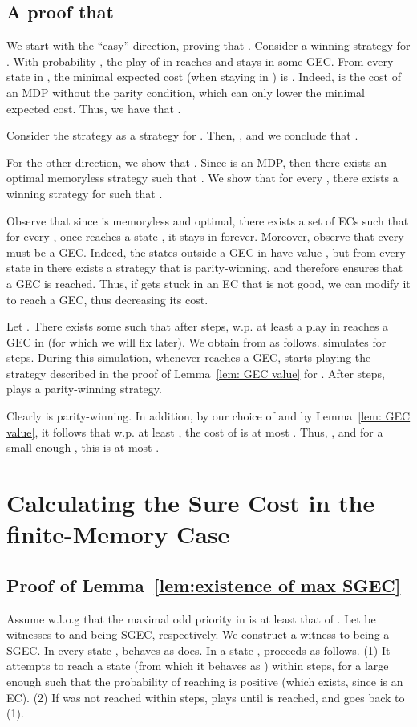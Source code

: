 \documentclass[runningheads,a4paper]{llncs}
\newcommand{\gec}{{GEC}\xspace}
\newcommand{\sgec}{{SGEC}\xspace}
\begin{document}
\subsection{A proof that }

We start with the ``easy'' direction, proving that . Consider a winning strategy  for . With probability , the play of  in  reaches and stays in some \gec . From every state in , the minimal expected cost (when staying in ) is . Indeed,  is the cost of an MDP without the parity condition, which can only lower the minimal expected cost.
 Thus, we have that .

Consider the strategy  as a strategy for . Then, , and we conclude that .

For the other direction, we show that . Since  is an MDP, then there exists an optimal memoryless strategy  such that . We show that for every , there exists a winning strategy  for  such that . 

Observe that since  is memoryless and optimal, there exists a set of ECs   such that for every , once  reaches a state , it stays in  forever. Moreover, observe that every  must be a \gec. Indeed, the states outside a \gec in  have value , but from every state in  there exists a strategy that is parity-winning, and therefore ensures that a \gec is reached. Thus, if  gets stuck in an EC that is not good, we can modify it to reach a \gec, thus decreasing its cost. 

Let . There exists some  such that after  steps, w.p. at least  a play in  reaches a \gec in  (for  which we will fix later). We obtain  from  as follows.  simulates  for  steps. During this simulation, whenever  reaches a \gec ,  starts playing the strategy described in the proof of Lemma~\ref{lem: GEC value} for . After  steps,  plays a parity-winning strategy. 

Clearly  is parity-winning. In addition, by our choice of  and by Lemma~\ref{lem: GEC value}, it follows that w.p. at least , the cost of  is at most . Thus, , and for a small enough , this is at most .


\section{Calculating the Sure Cost in the finite-Memory Case}
\label{apx:finite memory}

\subsection{Proof of Lemma~\ref{lem:existence of max SGEC}}
\label{apx:existence of max SGEC}
Assume w.l.o.g that the maximal odd priority in  is at least that of . Let  be witnesses to  and  being \sgec, respectively. We construct a witness  to  being a \sgec. In every state ,  behaves as  does. In a state ,  proceeds as follows. (1) It attempts to reach a state  (from which it behaves as ) within  steps, for a large enough  such that the probability of reaching  is positive (which exists, since  is an EC). (2) If  was not reached within  steps,  plays  until  is reached, and goes back to (1). 
\end{document}
